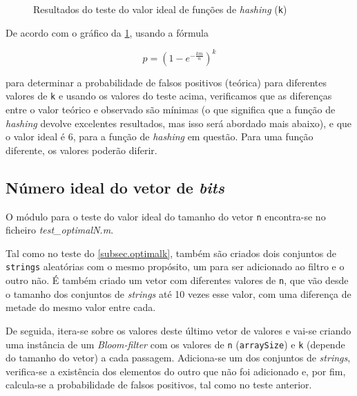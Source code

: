 \documentclass[a4paper,11pt,openright,oneside]{report}
\begin{document}
\begin{figure}[ht]	
\center
{}
\caption{Resultados do teste do valor ideal de funções de \textit{hashing} (\texttt{k})}
\label{fig:optimalk}
\end{figure}

De acordo com o gráfico da \ref{fig:optimalk}, usando a fórmula 

$$ p =  \left(1 - e^{-\frac{km}{n}}\right)^k $$

para determinar a probabilidade de falsos positivos (teórica) para diferentes valores de \texttt{k} e usando os valores do teste acima, verificamos que as diferenças entre o valor teórico e observado são mínimas (o que significa que a função de \textit{hashing} devolve excelentes resultados, mas isso será abordado mais abaixo), e que o valor ideal é 6, para a função de \textit{hashing} em questão. Para uma função diferente, os valores poderão diferir.

\subsection{Número ideal do vetor de \textit{bits}}
\label{subsec.optimaln}

O módulo para o teste do valor ideal do tamanho do vetor \texttt{n} encontra-se no ficheiro \textit{test\_optimalN.m}.

Tal como no teste do \autoref{subsec.optimalk}, também são criados dois conjuntos de \texttt{strings} aleatórias com o mesmo propósito, um para ser adicionado ao filtro e o outro não. É também criado um vetor com diferentes valores de \texttt{n}, que vão desde o tamanho dos conjuntos de \textit{strings} até 10 vezes esse valor, com uma diferença de metade do mesmo valor entre cada.

De seguida, itera-se sobre os valores deste último vetor de valores e vai-se criando uma instância de um \textit{Bloom-filter} com os valores de \texttt{n} (\texttt{arraySize}) e \texttt{k} (depende do tamanho do vetor) a cada passagem. Adiciona-se um dos conjuntos de \textit{strings}, verifica-se a existência dos elementos do outro que não foi adicionado e, por fim, calcula-se a probabilidade de falsos positivos, tal como no teste anterior.
\end{document}
